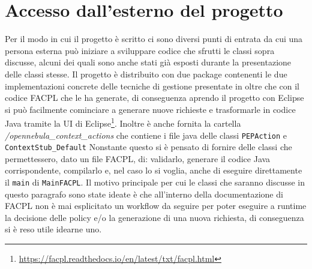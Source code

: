 \section{Accesso dall'esterno del progetto}
Per il modo in cui il progetto è scritto ci sono diversi punti di entrata da cui una persona esterna può iniziare a sviluppare codice che sfrutti le classi sopra discusse, alcuni dei quali sono anche stati già esposti durante la presentazione delle classi stesse. Il progetto è distribuito con due package contenenti le due implementazioni concrete delle tecniche di gestione presentate in \cite{10.1007/978-3-319-08260-8_6} oltre che con il codice FACPL che le ha generate, di conseguenza aprendo il progetto con Eclipse si può facilmente cominciare a generare nuove richieste e trasformarle in codice Java tramite la UI di Eclipse\footnote{\url{https://facpl.readthedocs.io/en/latest/txt/facpl.html}}. Inoltre è anche fornita la cartella \emph{/opennebula\_context\_actions} che contiene i file java delle classi \texttt{PEPAction} e \texttt{ContextStub\_Default}\medbreak
Nonstante questo si è pensato di fornire delle classi che permettessero, dato un file FACPL, di: validarlo, generare il codice Java corrispondente, compilarlo e, nel caso lo si voglia, anche di eseguire direttamente il \texttt{main} di \texttt{MainFACPL}. Il motivo principale per cui le classi che saranno discusse in questo paragrafo sono state ideate è che all'interno della documentazione di FACPL non è mai esplicitato un workflow da seguire per poter eseguire a runtime la decisione delle policy e/o la generazione di una nuova richiesta, di conseguenza si è reso utile idearne uno.
